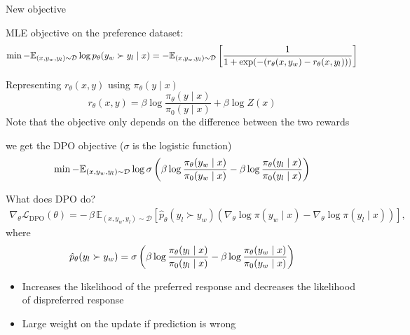 \documentclass[usenames,dvipsnames,notes,11pt,aspectratio=169,hyperref={colorlinks=true, linkcolor=blue}]{beamer}
\begin{document}
\begin{frame}
    {New objective}
    \begin{wideitemize}[<+->]
        \item MLE objective on the preference dataset:
            $$
            \min - \mathbb{E}_{(x,y_w,y_l)\sim \mathcal{D}}\log p_\theta(y_w \succ y_l \mid x) = - \mathbb{E}_{(x,y_w,y_l)\sim \mathcal{D}} \left[ \frac{1}{1+\exp(-(r_\theta(x,y_w) - r_\theta(x,y_l)))}  \right]
            $$
        \item Representing $r_\theta(x,y)$ using $\pi_\theta(y\mid x)$
            $$
            r_\theta(x,y) = \beta\log\frac{\pi_\theta(y\mid x)}{\pi_0(y\mid x)} + \beta\log Z(x)
            $$
            Note that the objective only depends on the difference between the two rewards
        \item we get the DPO objective ($\sigma$ is the logistic function)
            $$
            \min - \mathbb{E}_{(x,y_w,y_l)\sim \mathcal{D}} \log \sigma \left( 
                \beta\log\frac{\pi_\theta(y_w\mid x)}{\pi_0(y_w\mid x)} - 
                \beta\log\frac{\pi_\theta(y_l\mid x)}{\pi_0(y_l\mid x)}
             \right)
            $$
    \end{wideitemize}
\end{frame}

\begin{frame}
    {What does DPO do?}
    \begin{align*}
\nabla_\theta \mathcal{L}_{\text{DPO}}(\theta) =
        - \, \beta \, \mathbb{E}_{(x, y_w, y_l) \sim \mathcal{D}} \left[ \hat{p}_\theta(y_l\succ y_w) \left( \nabla_\theta \log \pi(y_w \mid x) - \nabla_\theta \log \pi(y_l \mid x) \right) \right],
    \end{align*}
    where
    \begin{align*}
\hat{p}_\theta(y_l\succ y_w) = \sigma \left( 
                \beta\log\frac{\pi_\theta(y_l\mid x)}{\pi_0(y_l\mid x)} - 
                \beta\log\frac{\pi_\theta(y_w\mid x)}{\pi_0(y_w\mid x)}
             \right)
    \end{align*}
    \begin{itemize}
        \item Increases the likelihood of the preferred response and decreases the likelihood of dispreferred response
        \item Large weight on the update if prediction is wrong 
    \end{itemize}
\end{frame}
\end{document}
